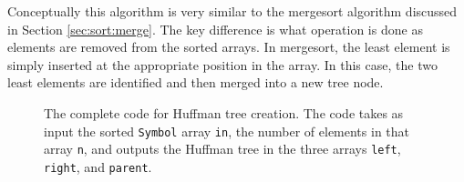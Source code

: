 \begin{aside}
Conceptually this algorithm is very similar to the mergesort algorithm discussed in Section \ref{sec:sort:merge}.   The key difference is what operation is done as elements are removed from the sorted arrays.  In mergesort, the least element is simply inserted at the appropriate position in the array.  In this case, the two least elements are identified and then merged into a new tree node.
\end{aside}

\begin{figure}
{\tiny
}
\end{figure}
\begin{figure}
{\tiny 
}
\end{figure}
\begin{figure}
{\tiny
}
\caption{The complete code for Huffman tree creation. The code takes as input the sorted \lstinline{Symbol} array \lstinline{in}, the number of elements in that array \lstinline{n}, and outputs the Huffman tree in the three arrays \lstinline{left}, \lstinline{right}, and \lstinline{parent}. }
\label{fig:huffman_create_tree.cpp}
\end{figure}

